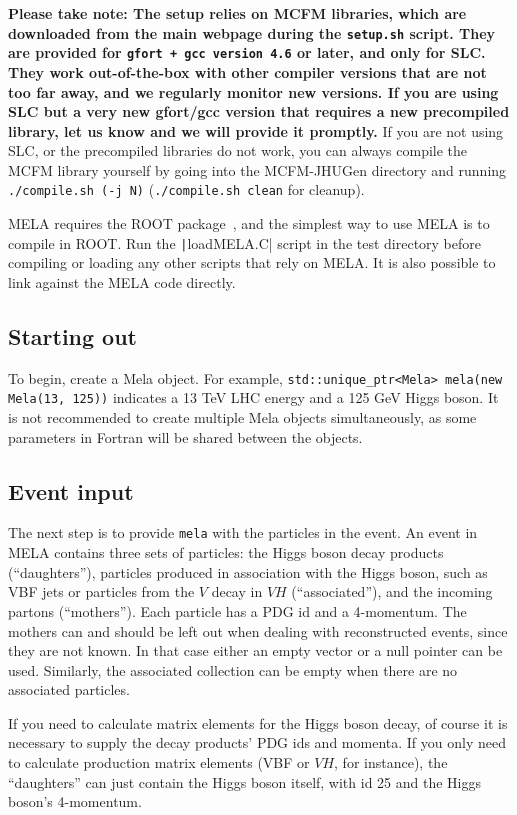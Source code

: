 \documentclass[aps,superscriptaddress,nofootinbib]{revtex4}
\begin{document}
\textbf{Please take note: The setup relies on MCFM libraries, which are downloaded from the main webpage during the \texttt{setup.sh} script.  They are provided for \texttt{gfort + gcc version 4.6} or later, and only for SLC. They work out-of-the-box with other compiler versions that are not too far away, and we regularly monitor new versions. If you are using SLC but a very new gfort/gcc version that requires a new precompiled library, let us know and we will provide it promptly.}
If you are not using SLC, or the precompiled libraries do not work, you can always compile the MCFM library yourself by going into the MCFM-JHUGen directory and running \verb|./compile.sh (-j N)| (\verb|./compile.sh clean| for cleanup).

MELA requires the ROOT package~\cite{root}, and the simplest way to use MELA is to compile in ROOT.  Run the \texttt|loadMELA.C| script in the test directory before compiling or loading any other scripts that rely on MELA.  It is also possible to link against the MELA code directly.
\subsection{Starting out}
To begin, create a Mela object.  For example, \verb|std::unique_ptr<Mela> mela(new Mela(13, 125))| indicates a 13 TeV LHC energy and a 125 GeV Higgs boson.  It is not recommended to create multiple Mela objects simultaneously, as some parameters in Fortran will be shared between the objects.
\subsection{Event input}
The next step is to provide \texttt{mela} with the particles in the event.  An event in MELA contains three sets of particles: the Higgs boson decay products (``daughters''), particles produced in association with the Higgs boson, such as VBF jets or particles from the $V$ decay in $VH$ (``associated''), and the incoming partons (``mothers'').  Each particle has a PDG id and a 4-momentum.  The mothers can and should be left out when dealing with reconstructed events, since they are not known.  In that case either an empty vector or a null pointer can be used.  Similarly, the associated collection can be empty when there are no associated particles.

If you need to calculate matrix elements for the Higgs boson decay, of course it is necessary to supply the decay products' PDG ids and momenta.  If you only need to calculate production matrix elements (VBF or $VH$, for instance), the ``daughters'' can just contain the Higgs boson itself, with id 25 and the Higgs boson's 4-momentum.
\end{document}
